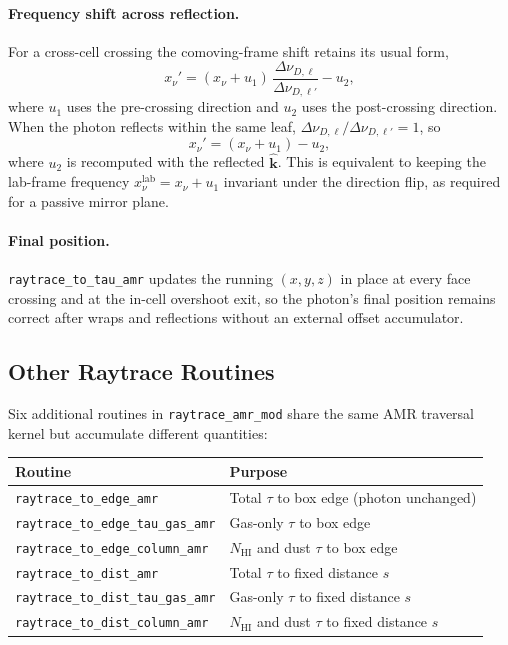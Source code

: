 \documentclass[english,a4paper]{my_memo}
\begin{document}
\paragraph{Frequency shift across reflection.}
For a cross-cell crossing the comoving-frame shift retains its usual
form,
\begin{equation*}
  x_\nu' = (x_\nu + u_1)\,\frac{\Delta\nu_{D,\ell}}{\Delta\nu_{D,\ell'}} - u_2,
\end{equation*}
where $u_1$ uses the pre-crossing direction and $u_2$ uses the
post-crossing direction.  When the photon reflects within the same
leaf, $\Delta\nu_{D,\ell} / \Delta\nu_{D,\ell'} = 1$, so
\begin{equation*}
  x_\nu' = (x_\nu + u_1) - u_2,
\end{equation*}
where $u_2$ is recomputed with the reflected $\hat{\mathbf{k}}$.  This
is equivalent to keeping the lab-frame frequency
$x_\nu^\mathrm{lab} = x_\nu + u_1$ invariant under the direction flip,
as required for a passive mirror plane.

\paragraph{Final position.}
\texttt{raytrace\_to\_tau\_amr} updates the running $(x,y,z)$ in place
at every face crossing and at the in-cell overshoot exit, so the
photon's final position remains correct after wraps and reflections
without an external offset accumulator.

\subsection{Other Raytrace Routines}

Six additional routines in \texttt{raytrace\_amr\_mod} share the same AMR
traversal kernel but accumulate different quantities:

\begin{center}
\begin{tabular}{ll}
\hline
Routine & Purpose \\
\hline
\texttt{raytrace\_to\_edge\_amr}            & Total $\tau$ to box edge (photon unchanged) \\
\texttt{raytrace\_to\_edge\_tau\_gas\_amr}  & Gas-only $\tau$ to box edge \\
\texttt{raytrace\_to\_edge\_column\_amr}    & $N_\mathrm{HI}$ and dust $\tau$ to box edge \\
\texttt{raytrace\_to\_dist\_amr}            & Total $\tau$ to fixed distance $s$ \\
\texttt{raytrace\_to\_dist\_tau\_gas\_amr}  & Gas-only $\tau$ to fixed distance $s$ \\
\texttt{raytrace\_to\_dist\_column\_amr}    & $N_\mathrm{HI}$ and dust $\tau$ to fixed distance $s$ \\
\hline
\end{tabular}
\end{center}
\end{document}
